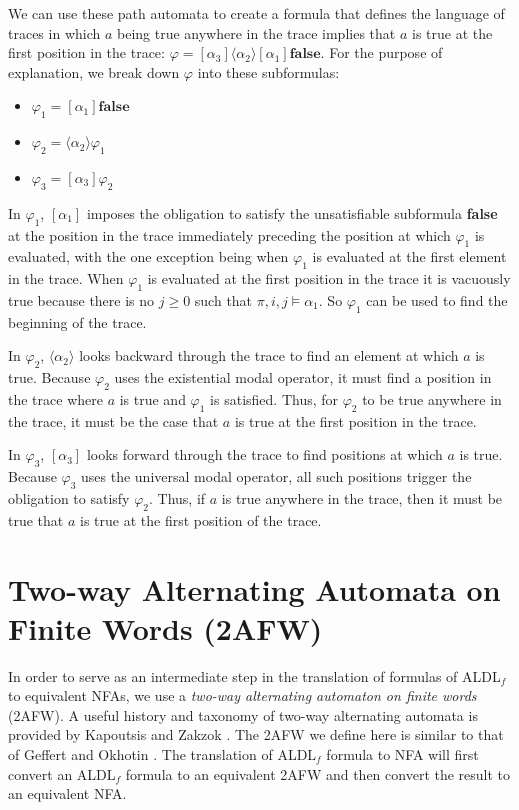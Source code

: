 \documentclass[10pt,a4paper]{amsart}
\theoremstyle{plain}
\theoremstyle{definition}
\theoremstyle{definition}
\newcommand{\dbox}[1]{\langle #1 \rangle}
\newcommand{\bbox}[1]{[ #1 ]}
\DeclareMathOperator{\?}{?}
\begin{document}
We can use these path automata to create a formula that defines the language of traces in which $a$ being true anywhere in the trace implies that $a$ is true at the first position in the trace: $ \varphi = \bbox{\alpha_3} \dbox{\alpha_2} \bbox{\alpha_1} \textbf{false}$. For the purpose of explanation, we break down $\varphi$ into these subformulas:

\begin{itemize}
  \item $\varphi_1 = \bbox{\alpha_1}\textbf{false}$

  \item $\varphi_2 = \dbox{\alpha_2}\varphi_1$

  \item $\varphi_3 = \bbox{\alpha_3} \varphi_2$
\end{itemize}

In $\varphi_1$, $\bbox{\alpha_1}$ imposes the obligation to satisfy the unsatisfiable subformula \textbf{false} at the position in the trace immediately preceding the position at which $\varphi_1$ is evaluated, with the one exception being when $\varphi_1$ is evaluated at the first element in the trace. When $\varphi_1$ is evaluated at the first position in the trace it is vacuously true because there is no $j \geq 0$ such that $\pi,i,j \models \alpha_1$. So $\varphi_1$ can be used to find the beginning of the trace.

In $\varphi_2$, $\dbox{\alpha_2}$ looks backward through the trace to find an element at which $a$ is true. Because $\varphi_2$ uses the existential modal operator, it must find a position in the trace where $a$ is true and $\varphi_1$ is satisfied. Thus, for $\varphi_2$ to be true anywhere in the trace, it must be the case that $a$ is true at the first position in the trace.

In $\varphi_3$, $\bbox{\alpha_3}$ looks forward through the trace to find positions at which $a$ is true. Because $\varphi_3$ uses the universal modal operator, all such positions trigger the obligation to satisfy $\varphi_2$. Thus, if $a$ is true anywhere in the trace, then it must be true that $a$ is true at the first position of the trace.

\section{Two-way Alternating Automata on Finite Words (2AFW)}

\label{ch:introducing2afw}

In order to serve as an intermediate step in the translation of formulas of ALDL$_f$ to equivalent
NFAs, we use a \textit{two-way alternating automaton on finite words} (2AFW). A useful history and
taxonomy of two-way alternating automata is provided by Kapoutsis and Zakzok \cite{kapoutsis}. The 2AFW we
define here is similar to that of Geffert and Okhotin \cite{geffert}. The translation of ALDL$_f$ formula to NFA will first convert
an ALDL$_f$ formula to an equivalent 2AFW and then convert the result to an equivalent NFA.
\end{document}
